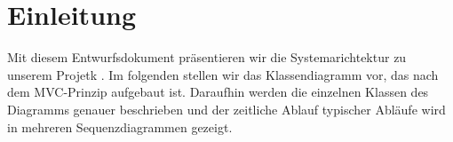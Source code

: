 \section{Einleitung}
Mit diesem Entwurfsdokument präsentieren wir die Systemarichtektur zu unserem Projetk \softwarename.
Im folgenden stellen wir das Klassendiagramm vor, das nach dem MVC-Prinzip aufgebaut ist.
Daraufhin werden die einzelnen Klassen des Diagramms genauer beschrieben und 
der zeitliche Ablauf typischer Abläufe wird in mehreren Sequenzdiagrammen gezeigt.